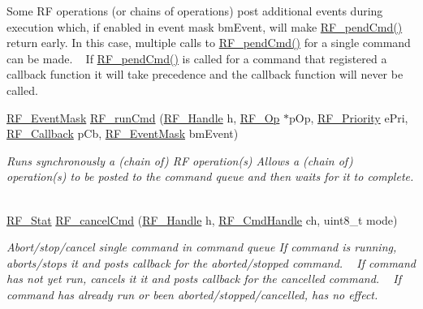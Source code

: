 \begin{DoxyCompactItemize}
\begin{DoxyCompactList}
 Some R\+F operations (or chains of operations) post additional events during execution which, if enabled in event mask bm\+Event, will make \hyperlink{_r_f_8h_a91c1cb2508311f822acbc08ace568a83}{R\+F\+\_\+pend\+Cmd()} return early. In this case, multiple calls to \hyperlink{_r_f_8h_a91c1cb2508311f822acbc08ace568a83}{R\+F\+\_\+pend\+Cmd()} for a single command can be made. ~\newline
 If \hyperlink{_r_f_8h_a91c1cb2508311f822acbc08ace568a83}{R\+F\+\_\+pend\+Cmd()} is called for a command that registered a callback function it will take precedence and the callback function will never be called. ~\newline
 \end{DoxyCompactList}\item 
\hyperlink{_r_f_8h_a128c46e18dbbaa781abb7abafc35233a}{R\+F\+\_\+\+Event\+Mask} \hyperlink{_r_f_8h_a248bebdd1d0bd6e0812cf18116987e54}{R\+F\+\_\+run\+Cmd} (\hyperlink{_r_f_8h_a5e8ab7fc87fb818f435d9b6226ee573f}{R\+F\+\_\+\+Handle} h, \hyperlink{_r_f_8h_a47ea3dea78019340e8f8ceb854de5f02}{R\+F\+\_\+\+Op} $\ast$p\+Op, \hyperlink{_r_f_8h_ae5f9a893d178e64e6d0a7a783ea06e32}{R\+F\+\_\+\+Priority} e\+Pri, \hyperlink{_r_f_8h_a4d2ce6dc70b0f329dc5e249ec10c574a}{R\+F\+\_\+\+Callback} p\+Cb, \hyperlink{_r_f_8h_a128c46e18dbbaa781abb7abafc35233a}{R\+F\+\_\+\+Event\+Mask} bm\+Event)
\begin{DoxyCompactList}\small\item\em Runs synchronously a (chain of) R\+F operation(s) Allows a (chain of) operation(s) to be posted to the command queue and then waits for it to complete. ~\newline
 \end{DoxyCompactList}\item 
\hyperlink{_r_f_8h_afdc219ddabc8427ecd552a6c78d9988f}{R\+F\+\_\+\+Stat} \hyperlink{_r_f_8h_aabe22ceae13a372be4ba135318aa849a}{R\+F\+\_\+cancel\+Cmd} (\hyperlink{_r_f_8h_a5e8ab7fc87fb818f435d9b6226ee573f}{R\+F\+\_\+\+Handle} h, \hyperlink{_r_f_8h_acab1f56c62a9fd1ad0a91a46b6da23f1}{R\+F\+\_\+\+Cmd\+Handle} ch, uint8\+\_\+t mode)
\begin{DoxyCompactList}\small\item\em Abort/stop/cancel single command in command queue If command is running, aborts/stops it and posts callback for the aborted/stopped command. ~\newline
 If command has not yet run, cancels it it and posts callback for the cancelled command. ~\newline
 If command has already run or been aborted/stopped/cancelled, has no effect.~\newline

\end{DoxyCompactList}
\end{DoxyCompactItemize}

